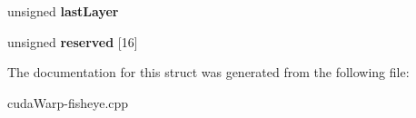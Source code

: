 \begin{DoxyCompactItemize}
\item 
unsigned {\bfseries last\+Layer}\hypertarget{structCUDA__RESOURCE__VIEW__DESC__st_aa280ece8d6b88af87a3b9b835fa78d58}{}\label{structCUDA__RESOURCE__VIEW__DESC__st_aa280ece8d6b88af87a3b9b835fa78d58}

\item 
unsigned {\bfseries reserved} \mbox{[}16\mbox{]}\hypertarget{structCUDA__RESOURCE__VIEW__DESC__st_a23df5f1934718049835fdeea5be19488}{}\label{structCUDA__RESOURCE__VIEW__DESC__st_a23df5f1934718049835fdeea5be19488}

\end{DoxyCompactItemize}


The documentation for this struct was generated from the following file\+:\begin{DoxyCompactItemize}
\item 
cuda\+Warp-\/fisheye.\+cpp\end{DoxyCompactItemize}
